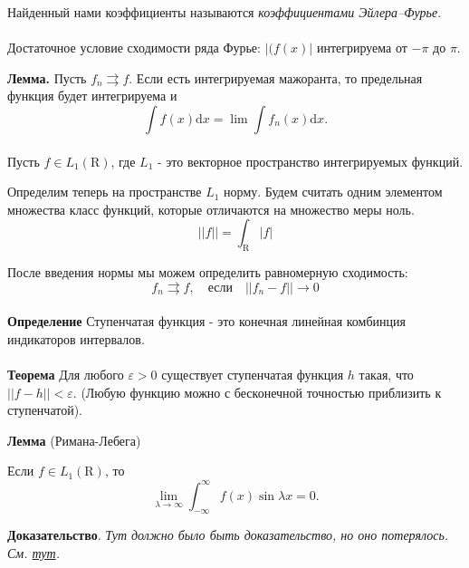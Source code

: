 \documentclass[12pt]{article}
\newcommand{\dd}{\ensuremath{\mathrm{d}}}
\begin{document}
Найденный нами коэффициенты называются \textit{коэффициентами Эйлера--Фурье}.

\paragraph{}

Достаточное условие сходимости ряда Фурье: $|(f(x)|$ интегрируема от $-\pi$ до $\pi$.

\textbf{Лемма.} Пусть $f_n \rightrightarrows f$.
Если есть интегрируемая мажоранта, то предельная функция будет интегрируема и $$\int f(x) \dd x = \lim \int f_n(x) \dd x. $$

\paragraph{}

Пусть $f \in L_1(\mathrm{R})$, где $L_1$ - это векторное пространство интегрируемых функций.

Определим теперь на пространстве $L_1$ норму. Будем считать одним элементом множества класс функций, которые отличаются на множество меры ноль.
$$||f|| = \int_\mathrm{R} |f|$$

После введения нормы мы можем определить равномерную сходимость:
$$f_n \rightrightarrows f, \quad \text{если} \quad ||f_n - f|| \rightarrow 0$$

\paragraph{}

\textbf{Определение} Ступенчатая функция - это конечная линейная комбинция индикаторов интервалов.

\paragraph{}

\textbf{Теорема} Для любого $\varepsilon > 0$ существует ступенчатая функция $h$ такая, что $||f - h|| < \varepsilon$.
(Любую функцию можно с бесконечной точностью приблизить к ступенчатой).

\vspace{1em}

\textbf{Лемма} (Римана-Лебега)

Если $f \in L_1(\mathrm{R})$, то $$\lim_{\lambda \to \infty} \int_{-\infty}^{\infty} f(x) \sin {\lambda x} = 0.$$

\textbf{Доказательство}. \textit{Тут должно было быть доказательство, но оно потерялось. См. \href{http://old.nsu.ru/education/funcan/node39.html}{тут}.}
\end{document}
